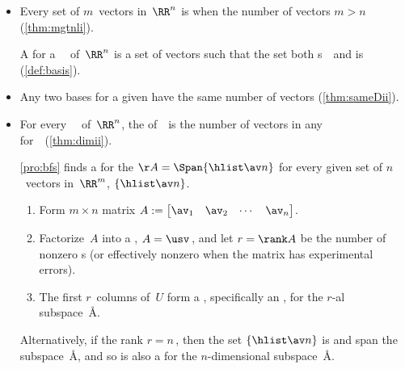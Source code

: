 \begin{itemize}
\itemhi For every \(n\times n\) matrix~\(A\), let \hlist\lambda m\ be distinct s of~\(A\) with corresponding s \hlist\vv m.
Then the set \(\{\hlist \vv m\}\) is  (\cref{thm:indepev}).

\itemme Let \hlist\vv m\ be vectors in~\(\RR^n\),
and let the \(n\times m\) matrix \(V=\begin{bmatrix} \vv_1&\vv_2&\cdots&\vv_m \end{bmatrix}\).  
Then the set \(\{\hlist\vv m\}\) is  if and only if the  system \(V\cv=\ov\) has a nonzero solution~\cv\ (\cref{thm:linhomo}).

\item Every  set of \(m\)~vectors in~\(\RR^n\) is  when the number of vectors \(m>n\) (\cref{thm:mgtnli}).

\itemme A  for a ~\WW\ of~\(\RR^n\) is a set of  vectors such that the set both s~\WW\ and is  (\cref{def:basis}).

\item Any two bases for a given  have the same number of vectors (\cref{thm:sameDii}).

\item For every ~\WW\ of~\(\RR^n\),  
the  of~\WW\ is the number of vectors in any  for~\WW\ (\cref{thm:dimii}). 

\itemme \cref{pro:bfs} finds a  for the  \(\AA=\Span\{\hlist\av n\}\) for every given set of $n$~vectors in~\(\RR^m\), $\{\hlist\av n\}$.
\begin{enumerate}
\item Form \(m\times n\) matrix $A:= \begin{bmatrix} \av_1 & \av_2& \cdots&\av_n \end{bmatrix}$. 
\item Factorize~\(A\) into a \svd, $A=\usv$\,, and let \(r=\rank A\) be the number of nonzero s (or effectively nonzero when the matrix has experimental errors).
\item The first \(r\)~columns of~\(U\) form a , specifically an , for the \(r\)-al subspace~\AA.
\end{enumerate}
Alternatively, if the rank \(r=n\)\,, then the set \(\{\hlist\av n\}\) is  and span the subspace~\AA, and so is also a  for the \(n\)-dimensional subspace~\AA.



\end{itemize}
